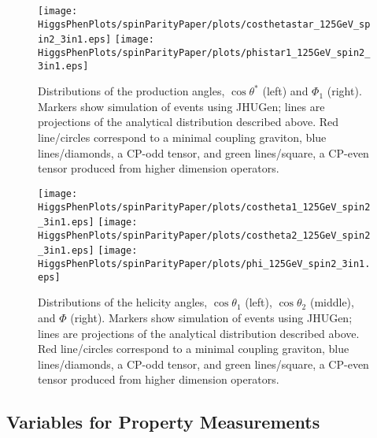 \begin{figure}
\begin{center}
\texttt{[image: HiggsPhenPlots/spinParityPaper/plots/costhetastar\_125GeV\_spin2\_3in1.eps]}
\texttt{[image: HiggsPhenPlots/spinParityPaper/plots/phistar1\_125GeV\_spin2\_3in1.eps]}
\caption{Distributions of the production angles, $\cos\theta^*$ (left) and
$\Phi_1$ (right). Markers show simulation of events using JHUGen; lines
are projections
of the analytical distribution described above.  Red line/circles correspond
to a minimal coupling graviton, blue lines/diamonds, a CP-odd tensor, 
and green lines/square, 
a CP-even tensor produced from higher dimension operators.}
\label{fig:TensorProdAngles}
\end{center}
\end{figure}

\begin{figure}
\begin{center}
\texttt{[image: HiggsPhenPlots/spinParityPaper/plots/costheta1\_125GeV\_spin2\_3in1.eps]}
\texttt{[image: HiggsPhenPlots/spinParityPaper/plots/costheta2\_125GeV\_spin2\_3in1.eps]}
\texttt{[image: HiggsPhenPlots/spinParityPaper/plots/phi\_125GeV\_spin2\_3in1.eps]}
\caption{Distributions of the helicity angles, $\cos\theta_1$ (left), 
$\cos\theta_2$ (middle), and $\Phi$ (right). Markers show simulation of 
events using JHUGen; lines are projections
of the analytical distribution described above.  Red line/circles correspond
to a minimal coupling graviton, blue lines/diamonds, a CP-odd tensor, 
and green lines/square, 
a CP-even tensor produced from higher dimension operators.}
\label{fig:TensorHelicityAngles}
\end{center}
\end{figure}

\subsection{Variables for Property Measurements}
\label{sec:Spin-parity}

